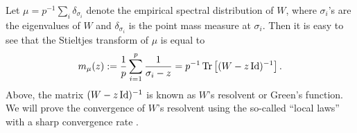 Let $\mu=p^{-1}\sum_{i} \delta_{\sigma_i}$ denote the empirical spectral distribution of $W$, where $\sigma_i$'s are the eigenvalues of $W$ and $\delta_{\sigma_i}$ is the point mass measure at $\sigma_i$. Then it is easy to see that the Stieltjes transform of $\mu$ is equal to
 \[ m_{\mu}(z) := \frac{1}{p}\sum_{i=1}^p \frac{1}{\sigma_i - z}= p^{-1}\operatorname{Tr}\left[(W-z\operatorname{Id})^{-1}\right]. \]
Above, the matrix $(W - z\operatorname{Id})^{-1}$ is known as $W$'s resolvent or Green's function.
We will prove the convergence of $W$'s resolvent using the so-called ``local laws'' with a sharp convergence rate \cite{isotropic,erdos2017dynamical,Anisotropic}.



